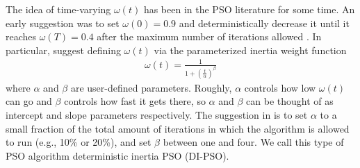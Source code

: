 \documentclass[12pt]{article}
\begin{document}
The idea of time-varying $\omega(t)$ has been in the PSO literature for some time. An early suggestion was to set $\omega(0)=0.9$ and deterministically decrease it until it reaches $\omega(T)=0.4$ after the maximum number of iterations allowed \citep{eberhart2000comparing}. In particular, \citet{tuppadung2011comparing} suggest defining $\omega(t)$ via the parameterized inertia weight function
\begin{align}\label{eq:inertiafun}
\omega(t) = \frac{1}{1 + \left(\frac{t}{\alpha}\right)^{\beta}}
\end{align}
where $\alpha$ and $\beta$ are user-defined parameters. Roughly, $\alpha$ controls how low $\omega(t)$ can go and $\beta$ controls how fast it gets there, so $\alpha$ and $\beta$ can be thought of as intercept and slope parameters respectively. The suggestion in \citet{tuppadung2011comparing} is to set $\alpha$ to a small fraction of the total amount of iterations in which the algorithm is allowed to run (e.g., 10\% or 20\%), and set $\beta$ between one and four. We call this type of PSO algorithm deterministic inertia PSO (DI-PSO).
\end{document}
